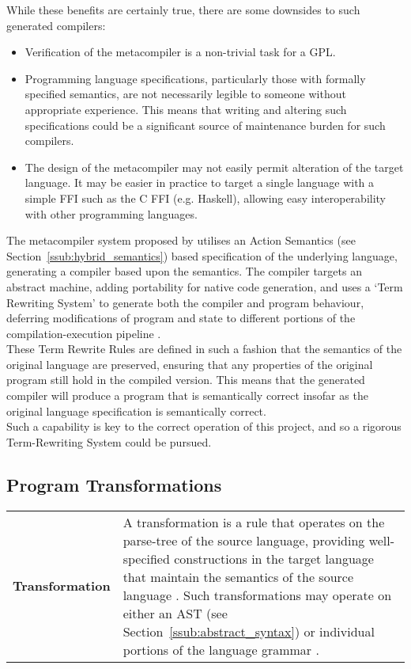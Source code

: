 \documentclass[a4paper,11pt]{report}
\newcommand{\defblock}[3]{
    \begin{longtable}{l p{#1}} 
        \textbf{#2} & #3
    \end{longtable}
}
\begin{document}
While these benefits are certainly true, there are some downsides to such generated compilers:
\begin{itemize}
    \item Verification of the metacompiler is a non-trivial task for a GPL.
    \item Programming language specifications, particularly those with formally specified semantics, are not necessarily legible to someone without appropriate experience. 
    This means that writing and altering such specifications could be a significant source of maintenance burden for such compilers.
    \item The design of the metacompiler may not easily permit alteration of the target language.
    It may be easier in practice to target a single language with a simple FFI such as the C FFI (e.g. Haskell), allowing easy interoperability with other programming languages. 
\end{itemize}

The metacompiler system proposed by \citet{diehl1996semantics} utilises an Action Semantics (see Section~\ref{ssub:hybrid_semantics}) based specification of the underlying language, generating a compiler based upon the semantics. 
The compiler targets an abstract machine, adding portability for native code generation, and uses a `Term Rewriting System' to generate both the compiler and program behaviour, deferring modifications of program and state to different portions of the compilation-execution pipeline \citep[pg. 59]{diehl1996semantics}.\\

These Term Rewrite Rules are defined in such a fashion that the semantics of the original language are preserved, ensuring that any properties of the original program still hold in the compiled version.
This means that the generated compiler will produce a program that is semantically correct insofar as the original language specification is semantically correct. \\

Such a capability is key to the correct operation of this project, and so a rigorous Term-Rewriting System could be pursued. 


\subsection{Program Transformations} %
\label{sub:program_transformations}
\defblock{10cm}{Transformation}{
    A transformation is a rule that operates on the parse-tree of the source language, providing well-specified constructions in the target language that maintain the semantics of the source language \citep{diehl1996semantics}.
    Such transformations may operate on either an AST (see Section~\ref{ssub:abstract_syntax}) or individual portions of the language grammar \citep{brabrand2003metafront}.
}
\end{document}
